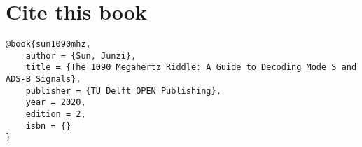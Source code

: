 



\chapter{Cite this book}

\begin{verbatim}
@book{sun1090mhz,
    author = {Sun, Junzi}, 
    title = {The 1090 Megahertz Riddle: A Guide to Decoding Mode S and ADS-B Signals},
    publisher = {TU Delft OPEN Publishing},
    year = 2020,
    edition = 2,
    isbn = {}
}
\end{verbatim}